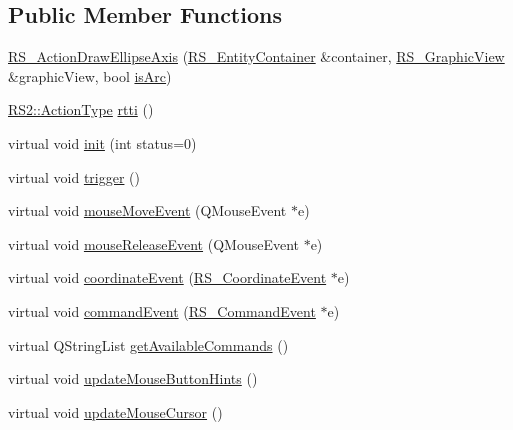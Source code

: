 \subsection*{Public Member Functions}
\begin{DoxyCompactItemize}
\item 
\hyperlink{classRS__ActionDrawEllipseAxis_a6bb9e71dd417dcf4499a90a1c4e3ac13}{R\-S\-\_\-\-Action\-Draw\-Ellipse\-Axis} (\hyperlink{classRS__EntityContainer}{R\-S\-\_\-\-Entity\-Container} \&container, \hyperlink{classRS__GraphicView}{R\-S\-\_\-\-Graphic\-View} \&graphic\-View, bool \hyperlink{classRS__ActionDrawEllipseAxis_a325339ed6e8fad3e25930f0bc80b8264}{is\-Arc})
\item 
\hyperlink{classRS2_afe3523e0bc41fd637b892321cfc4b9d7}{R\-S2\-::\-Action\-Type} \hyperlink{classRS__ActionDrawEllipseAxis_a03cf3c76f4578f5d8167d79a3f914d0e}{rtti} ()
\item 
virtual void \hyperlink{classRS__ActionDrawEllipseAxis_abab81e44a6873bb54407ab49ef2a17e7}{init} (int status=0)
\item 
virtual void \hyperlink{classRS__ActionDrawEllipseAxis_aba40cbf6a7cb35b72511ff276bd17f05}{trigger} ()
\item 
virtual void \hyperlink{classRS__ActionDrawEllipseAxis_a09c68f71b091490adb876d69b20639b6}{mouse\-Move\-Event} (Q\-Mouse\-Event $\ast$e)
\item 
virtual void \hyperlink{classRS__ActionDrawEllipseAxis_a3e5c104916c927a89c38556bc85a8e01}{mouse\-Release\-Event} (Q\-Mouse\-Event $\ast$e)
\item 
virtual void \hyperlink{classRS__ActionDrawEllipseAxis_a4bc53ed7ad07dcdd481d767f1a884dc1}{coordinate\-Event} (\hyperlink{classRS__CoordinateEvent}{R\-S\-\_\-\-Coordinate\-Event} $\ast$e)
\item 
virtual void \hyperlink{classRS__ActionDrawEllipseAxis_a6219a47e51ac622f331cc691eb20c561}{command\-Event} (\hyperlink{classRS__CommandEvent}{R\-S\-\_\-\-Command\-Event} $\ast$e)
\item 
virtual Q\-String\-List \hyperlink{classRS__ActionDrawEllipseAxis_a18f6ea55740b444d075776221d6a6825}{get\-Available\-Commands} ()
\item 
virtual void \hyperlink{classRS__ActionDrawEllipseAxis_a543d858cd75ec452f2dce0ce6ba1f555}{update\-Mouse\-Button\-Hints} ()
\item 
virtual void \hyperlink{classRS__ActionDrawEllipseAxis_a263f795fe622e59e457d1272c793fb8d}{update\-Mouse\-Cursor} ()
\end{DoxyCompactItemize}
